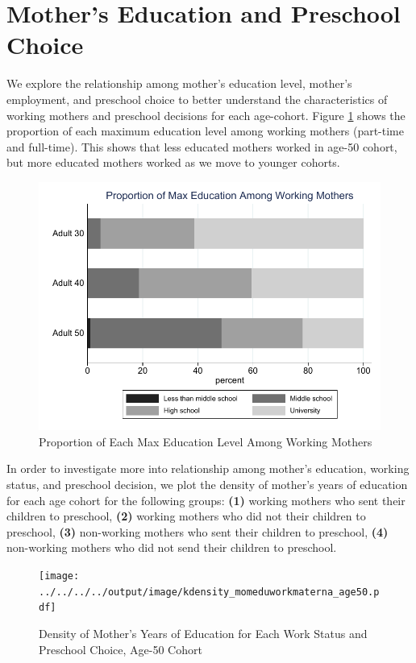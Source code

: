 \documentclass[12pt]{article}
\begin{document}
\section{Mother's Education and Preschool Choice}
We explore the relationship among mother's education level, mother's employment, and preschool choice to better understand the characteristics of working mothers and preschool decisions for each age-cohort. Figure \ref{fig:m-maxedu-work} shows the proportion of each maximum education level among working mothers (part-time and full-time). This shows that less educated mothers worked in age-50 cohort, but more educated mothers worked as we move to younger cohorts. 

\begin{figure}[H] \caption{Proportion of Each Max Education Level Among Working Mothers} \label{fig:m-maxedu-work}
\centering
\includegraphics[scale=0.9]{../../../../output/image/bar_momeduwork.pdf}
\end{figure}

In order to investigate more into relationship among mother's education, working status, and preschool decision, we plot the density of mother's years of education for each age cohort for the following groups: \textbf{(1)} working mothers who sent their children to preschool, \textbf{(2)} working mothers who did not their children to preschool, \textbf{(3)} non-working mothers who sent their children to preschool, \textbf{(4)} non-working mothers who did not send their children to preschool.

\begin{figure}[H] \caption{Density of Mother's Years of Education for Each Work Status and Preschool Choice, Age-50 Cohort} \label{fig:density-medu-age50}
\centering
\texttt{[image: ../../../../output/image/kdensity\_momeduworkmaterna\_age50.pdf]}
\end{figure}
\end{document}
